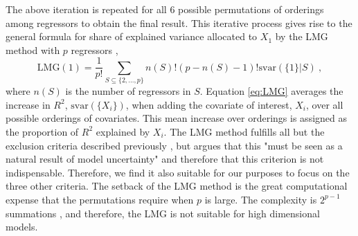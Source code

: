 The above iteration is repeated for all 6 possible permutations of orderings among regressors to obtain the final result.
This iterative process gives rise to the general formula for share of explained variance allocated to $X_1$ by the LMG method with $p$ regressors \citep{gromping_relaimpo},
\begin{equation}
    \label{eq:LMG}
    \text{LMG}(1) = \frac{1}{p!} \sum_{S \subseteq \{2, ..., p\}} n(S)! (p - n(S)-1)! \text{svar}(\{1\} \lvert S) \ ,
\end{equation} 
where $n(S)$ is the number of regressors in $S$.
Equation \eqref{eq:LMG} averages the increase in $R^2$, $\text{svar}(\{X_i\})$, when adding the covariate of interest, $X_i$, over all possible orderings of covariates. 
This mean increase over orderings is assigned as the proportion of $R^2$ explained by $X_i$.
The LMG method fulfills all but the exclusion criteria described previously \citep{gromping_relaimpo}, but \citet{gromping_relaimpo} argues that this "must be seen as a natural result of model uncertainty" and therefore that this criterion is not indispensable.
Therefore, we find it also suitable for our purposes to focus on the three other criteria.
The setback of the LMG method is the great computational expense that the permutations require when $p$ is large. The complexity is $2^{p-1}$ summations \citep{gromping_relaimpo}, and therefore, the LMG is not suitable for high dimensional models. 



